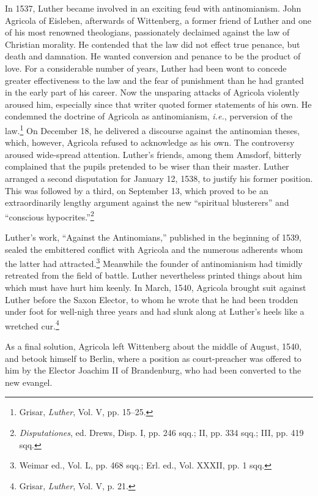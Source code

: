 In 1537, Luther became involved in an exciting feud with antinomianism.
John Agricola of Eisleben, afterwards of Wittenberg, a
former friend of Luther and one of his most renowned theologians,
passionately declaimed against the law of Christian morality. He contended
that the law did not effect true penance, but death and damnation. He
wanted conversion and penance to be the product of love.
For a considerable number of years, Luther had been wont to concede
greater effectiveness to the law and the fear of punishment than he
had granted in the early part of his career. Now the unsparing attacks
of Agricola violently aroused him, especially since that writer
quoted former statements of his own. He condemned the doctrine of
Agricola as antinomianism, \textit{i.e.}, perversion of the law.\footnote
{Grisar, \textit{Luther}, Vol. V, pp. 15--25.}
On December 18, he delivered a discourse against the antinomian theses, which,
however, Agricola refused to acknowledge as his own. The controversy
aroused wide-spread attention. Luther’s friends, among them
Amsdorf, bitterly complained that the pupils pretended to be wiser
than their master. Luther arranged a second disputation for January
12, 1538, to justify his former position. This was followed by a third,
on September 13, which proved to be an extraordinarily lengthy argument
against the new “spiritual blusterers” and “conscious hypocrites.”\footnote{\textit{Disputationes}, ed. Drews, Disp. I, pp. 246 sqq.; II, pp. 334 sqq.; III, pp. 419 sqq.}

Luther’s work, “Against the Antinomians,” published in the
beginning of 1539, sealed the embittered conflict with Agricola and
the numerous adherents whom the latter had attracted.\footnote{Weimar ed., Vol. L, pp. 468 sqq.; Erl. ed., Vol. XXXII, pp. 1 sqq.}
 Meanwhile
the founder of antinomianism had timidly retreated from the field of
battle. Luther nevertheless printed things about him which must have
hurt him keenly. In March, 1540, Agricola brought suit against Luther
before the Saxon Elector, to whom he wrote that he had been
trodden under foot for well-nigh three years and had slunk along
at Luther’s heels like a wretched cur.\footnote{Grisar, \textit{Luther}, Vol. V, p. 21.}

As a final solution, Agricola left Wittenberg about the middle of
August, 1540, and betook himself to Berlin, where a position as court-preacher
was offered to him by the Elector Joachim II of Brandenburg, who had been
converted to the new evangel.
